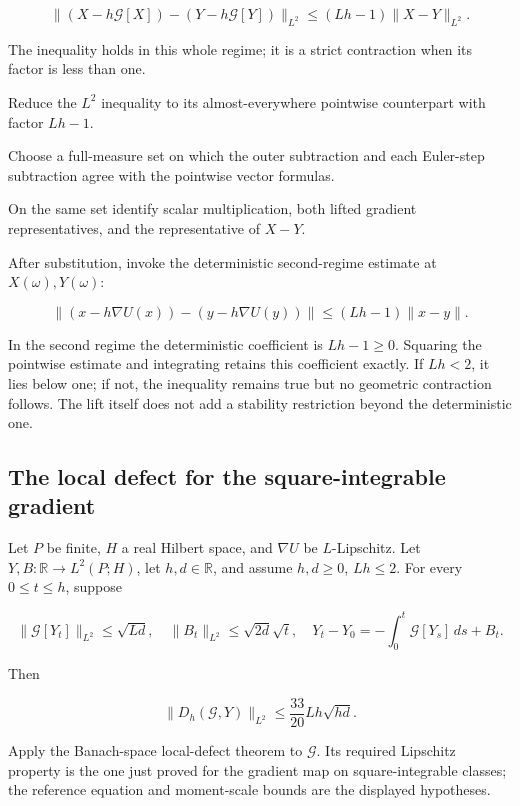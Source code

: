 \documentclass[11pt,a4paper]{report}
\begin{document}
\[\|(X-h\mathcal G[X])-(Y-h\mathcal G[Y])\|_{L^2}\le(Lh-1)\|X-Y\|_{L^2}.\]

The inequality holds in this whole regime; it is a strict contraction when its factor is less than one.



Reduce the \(L^2\) inequality to its almost-everywhere pointwise counterpart with factor \(Lh-1\).



Choose a full-measure set on which the outer subtraction and each Euler-step subtraction agree with the pointwise vector formulas.



On the same set identify scalar multiplication, both lifted gradient representatives, and the representative of \(X-Y\).



After substitution, invoke the deterministic second-regime estimate at \(X(\omega),Y(\omega)\):

\[\|(x-h\nabla U(x))-(y-h\nabla U(y))\|\le(Lh-1)\|x-y\|.\]

In the second regime the deterministic coefficient is \(Lh-1\ge0\). Squaring the pointwise estimate and integrating retains this coefficient exactly. If \(Lh<2\), it lies below one; if not, the inequality remains true but no geometric contraction follows. The lift itself does not add a stability restriction beyond the deterministic one.

\subsection{\texorpdfstring{The local defect for the square-integrable gradient}{The local defect for the square-integrable gradient}}
\label{report-step-UnadjustedLangevin-LpDrift-lean-8}


Let \(P\) be finite, \(H\) a real Hilbert space, and \(\nabla U\) be \(L\)-Lipschitz. Let \(Y,B:\mathbb R\to L^2(P;H)\), let \(h,d\in\mathbb R\), and assume \(h,d\ge0\), \(Lh\le2\). For every \(0\le t\le h\), suppose

\[\|\mathcal G[Y_t]\|_{L^2}\le\sqrt{Ld},\quad\|B_t\|_{L^2}\le\sqrt{2d}\sqrt t,\quad Y_t-Y_0=-\int_0^t\mathcal G[Y_s]\,ds+B_t.\]

Then

\[\|D_h(\mathcal G,Y)\|_{L^2}\le\frac{33}{20}Lh\sqrt{hd}.\]

Apply the Banach-space local-defect theorem to \(\mathcal G\). Its required Lipschitz property is the one just proved for the gradient map on square-integrable classes; the reference equation and moment-scale bounds are the displayed hypotheses.
\end{document}
